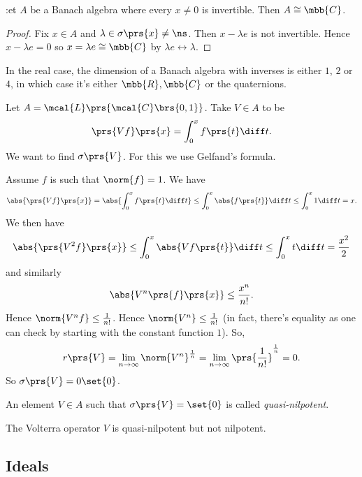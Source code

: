 \documentclass[10pt, twoside]{book}
\begin{document}
\begin{corollary}
:et $A$ be a Banach algebra where every $x \neq 0$ is invertible.
Then $A \cong \mbb{C}$.
\end{corollary}

\begin{proof}
Fix $x \in A$ and $\lambda \in \sigma\prs{x} \neq \ns$. Then $x-\lambda e$ is not invertible. Hence $x - \lambda e = 0$ so $x = \lambda e \cong \mbb{C}$ by $\lambda e \leftrightarrow \lambda$.
\end{proof}

\begin{remark}
In the real case, the dimension of a Banach algebra with inverses is either $1$, $2$ or $4$, in which case it's either $\mbb{R}, \mbb{C}$ or the quaternions.
\end{remark}

\begin{example}
Let $A = \mcal{L}\prs{\mcal{C}\brs{0,1}}$. Take $V \in A$ to be
\[\prs{Vf}\prs{x} = \int_0^x f\prs{t} \diff t \text{.}\]
We want to find $\sigma\prs{V}$. For this we use Gelfand's formula.

Assume $f$ is such that $\norm{f} = 1$. We have
\[\abs{\prs{V f}\prs{x}} = \abs{\int_0^x f\prs{t} \diff t} \leq \int_0^x \abs{f\prs{t}} \diff t \leq \int_0^x 1 \diff t = x \text{.}\]
We then have
\[\abs{\prs{V^2 f}\prs{x}} \leq \int_0^x \abs{V f\prs{t}}\diff t \leq \int_0^x t \diff t  = \frac{x^2}{2}\]
and similarly
\[\abs{V^n\prs{f}\prs{x}} \leq \frac{x^n}{n!} \text{.}\]
Hence $\norm{V^n f} \leq \frac{1}{n!}$.
Hence
$\norm{V^n} \leq \frac{1}{n!}$ (in fact, there's equality as one can check by starting with the constant function $1$).
So, \[r\prs{V} = \lim_{n\to\infty} \norm{V^n}^{\frac{1}{n}} = \lim_{n\to\infty} \prs{\frac{1}{n!}}^{\frac{1}{n}} = 0 \text{.}\]
So $\sigma\prs{V} = 0\set{0}$.
\end{example}

\begin{definition}
An element $V \in A$ such that $\sigma\prs{V} = \set{0}$ is called \emph{quasi-nilpotent}.
\end{definition}

\begin{remark}
The Volterra operator $V$ is quasi-nilpotent but not nilpotent.
\end{remark}

\subsection{Ideals}
\end{document}
